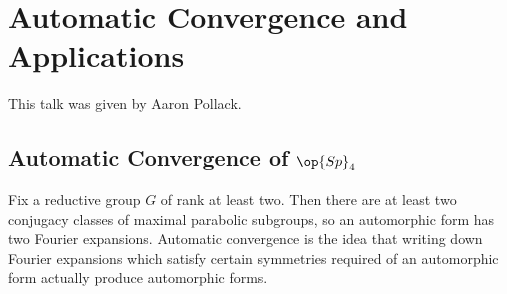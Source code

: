\documentclass{article}
\begin{document}
\section{Automatic Convergence and Applications}
This talk was given by Aaron Pollack.

\subsection{Automatic Convergence of \texorpdfstring{$\op{Sp}_4$}{ Sp4}}
Fix a reductive group $G$ of rank at least two. Then there are at least two conjugacy classes of maximal parabolic subgroups, so an automorphic form has two Fourier expansions. Automatic convergence is the idea that writing down Fourier expansions which satisfy certain symmetries required of an automorphic form actually produce automorphic forms.
\end{document}
